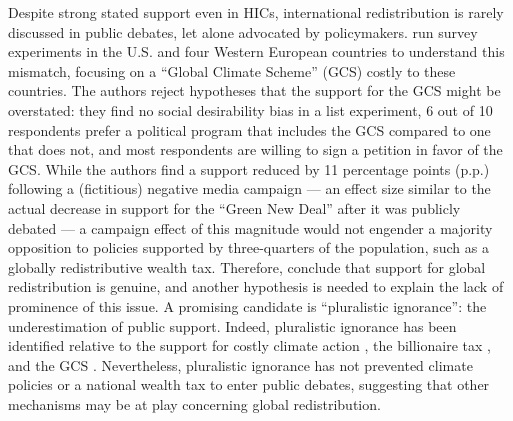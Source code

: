 \documentclass[12pt,english]{article}
\begin{document}
\begin{bibunit}
Despite strong stated support even in HICs, international redistribution is rarely discussed in public debates, let alone advocated %
by policymakers. %
\cite{fabre_majority_2025} run survey experiments in the U.S. and four Western European countries to understand this mismatch, focusing on a ``Global Climate Scheme'' (GCS) costly to these countries. The authors reject hypotheses that the support for the GCS might be overstated: they find no social desirability bias in a list experiment, 6 out of 10 respondents prefer a political program that includes the GCS compared to one that does not, and most respondents are willing to sign a petition in favor of the GCS. %
While the authors find a support reduced by 11 percentage points (p.p.) following a (fictitious) negative media campaign --- an effect size similar to the actual decrease in support for the ``Green New Deal'' after it was publicly debated \citep{gustafson_development_2019} --- a campaign effect of this magnitude would not engender a majority opposition to policies supported by three-quarters of the population, such as a globally redistributive wealth tax. Therefore, \cite{fabre_majority_2025} conclude that support for global redistribution is genuine, %
and another hypothesis is needed to explain the lack of prominence of this issue. A promising candidate is ``pluralistic ignorance'': the underestimation of public support. Indeed, pluralistic ignorance has been identified relative to the support for costly climate action \citep{andre_misperceived_2024,andre_globally_2024}, the billionaire tax \citep{cappelen_majority_2025}, and the GCS \citep{fabre_majority_2025}. 
Nevertheless, pluralistic ignorance has not prevented climate policies or a national wealth tax to enter public debates, suggesting that other mechanisms may be at play concerning global redistribution. 


\end{bibunit}
\end{document}
